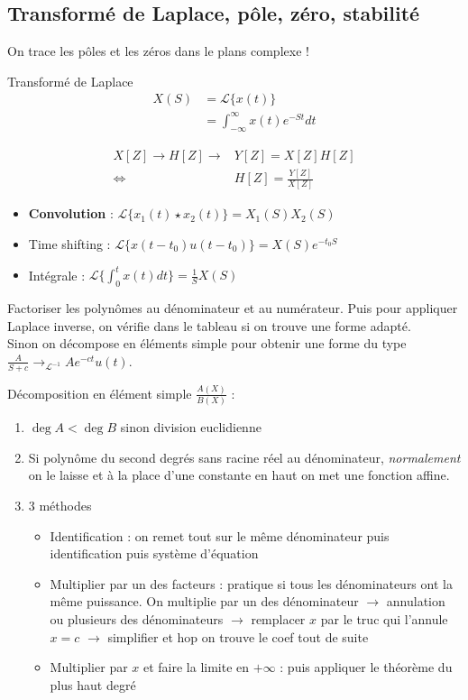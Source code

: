 \documentclass{article}
\theoremstyle{plain}%
\theoremstyle{definition}
\theoremstyle{remark}
\begin{document}
\subsection{Transformé de Laplace, pôle, zéro, stabilité}
On trace les pôles et les zéros dans le plans complexe ! 

Transformé de Laplace
\begin{align*}
    X(S) &= \mathcal{L}\{x(t)\} \\
        &= \int_{-\infty }^{\infty }x(t)e^{-St}dt
\end{align*}

\begin{align*}
    X[Z] \to H[Z] \to &Y[Z] = X[Z]H[Z] \\
    \Leftrightarrow & H[Z] = \frac{Y[Z]}{X[Z]}
\end{align*}

\begin{itemize}
    \item \textbf{Convolution} : $ \mathcal{L}\{x_1(t) \star x_2(t)\} = X_1(S) X_2(S)$ 
    \item Time shifting : $ \mathcal{L}\{x(t-t_0) u(t - t_0)\} = X(S)e^{-t_0 S}$ 
    \item Intégrale : $ \mathcal{L}\{\int_{0}^{t}x(t)dt\} = \frac{1}{S}X(S) $ 
\end{itemize}
Factoriser les polynômes au dénominateur et au numérateur. Puis pour appliquer Laplace inverse, on vérifie dans le tableau si on trouve une forme adapté. \\
Sinon on décompose en éléments simple pour obtenir une forme du type $ \frac{A}{S+c} \to _{\mathcal{L}^{-1}} A e^{-ct}u(t)$.

Décomposition en élément simple $ \frac{A(X)}{B(X)} $ : \begin{enumerate}
    \item $ \deg A < \deg B $ sinon division euclidienne
    \item Si polynôme du second degrés sans racine réel au dénominateur, \textit{normalement} on le laisse et à la place d'une constante en haut on met une fonction affine. 
    \item 3 méthodes \begin{itemize}
        \item Identification : on remet tout sur le même dénominateur puis identification puis système d'équation
        \item Multiplier par un des facteurs : pratique si tous les dénominateurs ont la même puissance. On multiplie par un des dénominateur $\rightarrow$ annulation ou plusieurs des dénominateurs $\rightarrow$ remplacer $ x $ par le truc qui l'annule $ x=c $ $\rightarrow$ simplifier et hop on trouve le coef tout de suite
        \item Multiplier par $ x $  et faire la limite en $ +\infty  $  : puis appliquer le théorème du plus haut degré
    \end{itemize}
\end{enumerate}
\end{document}
